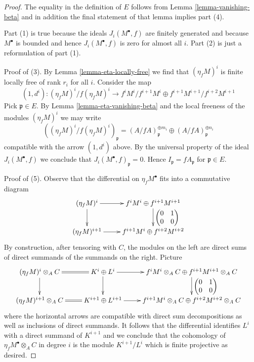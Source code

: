\documentclass[10pt,a4paper]{amsart}
\theoremstyle{plain}
\theoremstyle{definition}
\theoremstyle{remark}
\numberwithin{equation}{subsection}
\begin{document}
\begin{proof}
The equality in the definition of $E$ follows from
Lemma \ref{lemma-vanishing-beta} and in addition the
final statement of that lemma implies part (4).

\medskip\noindent
Part (1) is true because the ideals $J_i(M^\bullet, f)$ are finitely
generated and because $M^\bullet$ is bounded and hence $J_i(M^\bullet, f)$
is zero for almost all $i$. Part (2) is just a reformulation of part (1).

\medskip\noindent
Proof of (3). By Lemma \ref{lemma-eta-locally-free} we find that
$(\eta_fM)^i$ is finite locally free of rank $r_i$ for all $i$.
Consider the map
$$
(1, d^i) :
(\eta_fM)^i / f(\eta_fM)^i
\longrightarrow
f^iM^i/f^{i + 1}M^i \oplus f^{i + 1}M^{i + 1}/f^{i + 2}M^{i + 1}
$$
Pick $\mathfrak p \in E$. By Lemma \ref{lemma-eta-vanishing-beta}
and the local freeness of the modules $(\eta_fM)^i$ we may write
$$
\left((\eta_fM)^i / f(\eta_fM)^i\right)_\mathfrak p =
(A/fA)_\mathfrak p^{\oplus m_i} \oplus (A/fA)_\mathfrak p^{\oplus n_i}
$$
compatible with the arrow $(1, d^i)$ above. By the universal property of
the ideal $J_i(M^\bullet, f)$ we conclude that
$J_i(M^\bullet, f)_\mathfrak p = 0$.
Hence $I_\mathfrak p = fA_\mathfrak p$ for $\mathfrak p \in E$.

\medskip\noindent


\medskip\noindent
Proof of (5). Observe that the differential on $\eta_fM^\bullet$
fits into a commutative diagram
$$
\xymatrix{
(\eta_fM)^i \ar[d] \ar[r] &
f^iM^i \oplus f^{i + 1}M^{i + 1}
\ar[d]^{\left(
\begin{matrix}
0 & 1 \\
0 & 0
\end{matrix}
\right)} \\
(\eta_fM)^{i + 1} \ar[r] &
f^{i + 1}M^i \oplus f^{i + 2}M^{i + 2}
}
$$
By construction, after tensoring with $C$, the modules on the
left are direct sums of direct summands of the summands on the right.
Picture
$$
\xymatrix{
(\eta_fM)^i \otimes_A C \ar[d] \ar@{=}[r] &
K^i \oplus L^i \ar[r] \ar[d] &
f^iM^i \otimes_A C \oplus f^{i + 1}M^{i + 1} \otimes_A C
\ar[d]^{\left(
\begin{matrix}
0 & 1 \\
0 & 0
\end{matrix}
\right)} \\
(\eta_fM)^{i + 1} \otimes_A C \ar@{=}[r] &
K^{i + 1} \oplus L^{i + 1} \ar[r] &
f^{i + 1}M^i \otimes_A C \oplus f^{i + 2}M^{i + 2} \otimes_A C
}
$$
where the horizontal arrows are compatible with direct sum decompositions
as well as inclusions of direct summands.
It follows that the differential identifies $L^i$ with a direct summand
of $K^{i + 1}$ and we conclude that the cohomology of
$\eta_fM^\bullet \otimes_A C$ in degree $i$ is the
module $K^{i + 1}/L^i$ which is finite projective as desired.
\end{proof}
\end{document}
